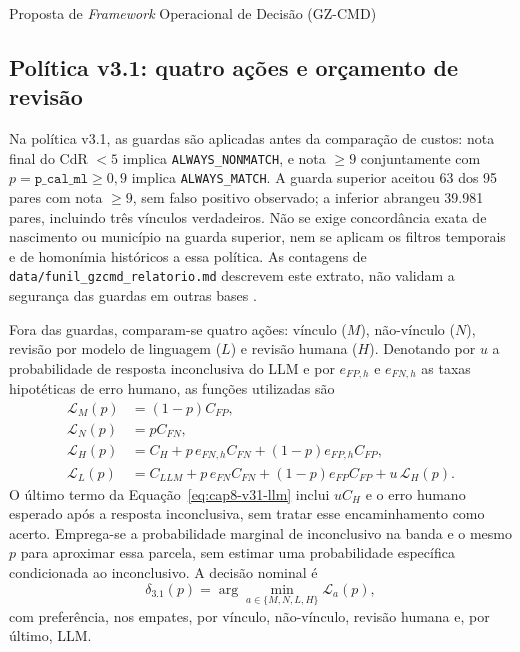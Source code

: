 \begin{chapter}{Proposta de \textit{Framework} Operacional de Decisão (GZ-CMD)}
\subsection{Política v3.1: quatro ações e orçamento de revisão}
\label{sec:cap8-politica-v31}

Na política v3.1, as guardas são aplicadas antes da comparação de custos: nota final do CdR $<5$ implica \texttt{ALWAYS\_NONMATCH}, e nota $\geq9$ conjuntamente com $p=\texttt{p\_cal\_ml}\geq0{,}9$ implica \texttt{ALWAYS\_MATCH}. A guarda superior aceitou 63 dos 95 pares com nota $\geq9$, sem falso positivo observado; a inferior abrangeu 39.981 pares, incluindo três vínculos verdadeiros. Não se exige concordância exata de nascimento ou município na guarda superior, nem se aplicam os filtros temporais e de homonímia históricos a essa política. As contagens de \texttt{data/funil\_gzcmd\_relatorio.md} descrevem este extrato, não validam a segurança das guardas em outras bases \cite{Jardim2026phdrepo}.

Fora das guardas, comparam-se quatro ações: vínculo ($M$), não-vínculo ($N$), revisão por modelo de linguagem ($L$) e revisão humana ($H$). Denotando por $u$ a probabilidade de resposta inconclusiva do LLM e por $e_{FP,h}$ e $e_{FN,h}$ as taxas hipotéticas de erro humano, as funções utilizadas são
\begin{align}
\mathcal{L}_M(p)&=(1-p)C_{FP}, \label{eq:cap8-v31-match}\\
\mathcal{L}_N(p)&=pC_{FN},\\
\mathcal{L}_H(p)&=C_H+p\,e_{FN,h}C_{FN}+(1-p)e_{FP,h}C_{FP},\\
\mathcal{L}_L(p)&=C_{LLM}+p\,e_{FN}C_{FN}+(1-p)e_{FP}C_{FP}+u\,\mathcal{L}_H(p).
\label{eq:cap8-v31-llm}
\end{align}
O último termo da Equação~\ref{eq:cap8-v31-llm} inclui $uC_H$ e o erro humano esperado após a resposta inconclusiva, sem tratar esse encaminhamento como acerto. Emprega-se a probabilidade marginal de inconclusivo na banda e o mesmo $p$ para aproximar essa parcela, sem estimar uma probabilidade específica condicionada ao inconclusivo. A decisão nominal é
\[
\delta_{3.1}(p)=\arg\min_{a\in\{M,N,L,H\}}\mathcal{L}_a(p),
\]
com preferência, nos empates, por vínculo, não-vínculo, revisão humana e, por último, LLM.


\end{chapter}
